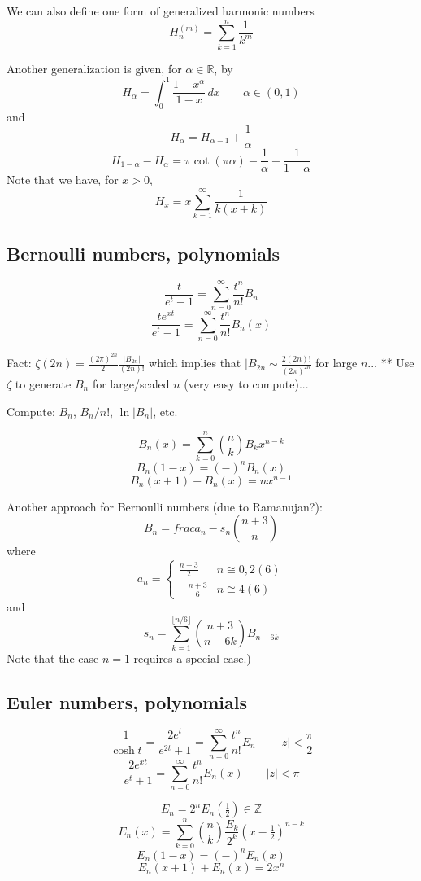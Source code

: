\documentclass[10pt,dvipdfmx,letterpaper,twoside]{article}
\newcommand{\RR}{{\mathbb{R}}}
\newcommand{\ZZ}{{\mathbb{Z}}}
\let\al=\alpha
\begin{document}
We can also define one form of generalized harmonic numbers
\[ H^{(m)}_n = \sum_{k=1}^n \frac{1}{k^m} \]

Another generalization is given, for $\al\in\RR$, by
\[ H_{\al} = \int_0^1 \frac{1-x^\al}{1-x}\,dx \qquad \al\in(0,1) \]
and
\[ H_{\al} = H_{\al-1} + \frac{1}{\al} \]
\[ H_{1-\al} - H_{\al} = \pi\cot(\pi\al) - \frac{1}{\al} + \frac{1}{1-\al} \]
Note that we have, for $x>0$,
\[ H_x = x\sum_{k=1}^\infty\frac{1}{k(x+k)} \]

\subsection{Bernoulli numbers, polynomials}

\[ \frac{t}{e^t-1} = \sum_{n=0}^\infty \frac{t^n}{n!} B_n \]
\[ \frac{t e^{xt}}{e^t-1} = \sum_{n=0}^\infty \frac{t^n}{n!} B_n(x) \]

Fact: $\zeta(2n) = \frac{(2\pi)^{2n}}{2} \frac{|B_{2n}|}{(2n)!}$ which implies
that $|B_{2n}\sim \frac{2(2n)!}{(2\pi)^{2n}}$ for large $n$...
** Use $\zeta$ to generate $B_n$ for large/scaled $n$ (very easy to compute)...

Compute: $B_n$, $B_n/n!$, $\ln|B_n|$, etc.

\[ B_n(x) = \sum_{k=0}^n\binom{n}{k}B_k x^{n-k} \]
\[ B_n(1-x) = (-)^n B_n(x) \]
\[ B_n(x+1) - B_n(x) = n x^{n-1} \]

Another approach for Bernoulli numbers (due to Ramanujan?):
\[ B_n = frac{a_n - s_n}{\binom{n+3}{n}} \]
where
\[ a_n = \begin{cases}\frac{n+3}{2} & n\cong0,2(6) \\ -\frac{n+3}{6} & n\cong4(6)\end{cases} \]
and
\[ s_n = \sum_{k=1}^{\lfloor n/6\rfloor} \binom{n+3}{n-6k} B_{n-6k} \]
Note that the case $n=1$ requires a special case.)

\subsection{Euler numbers, polynomials}

\[ \frac{1}{\cosh t} = \frac{2 e^{t}}{e^{2t}+1} = \sum_{n=0}^\infty \frac{t^n}{n!} E_n  \qquad|z|<\frac\pi2\]
\[ \frac{2 e^{xt}}{e^t+1} = \sum_{n=0}^\infty \frac{t^n}{n!} E_n(x) \qquad|z|<\pi\]

\[ E_n = 2^n E_n(\tfrac12)\in\ZZ \]
\[ E_n(x) = \sum_{k=0}^n\binom{n}{k}\frac{E_k}{2^k} (x-\tfrac12)^{n-k} \]
\[ E_n(1-x) = (-)^n E_n(x) \]
\[ E_n(x+1) + E_n(x) = 2 x^n \]
\end{document}
